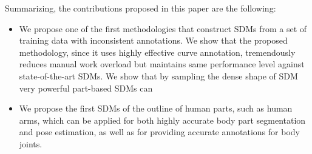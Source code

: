 Summarizing, the contributions proposed in this paper are the following:
\begin{itemize}

  \item We propose one of the first methodologies that construct SDMs from a set of training data with inconsistent annotations. We show that the proposed methodology, since it uses highly effective curve annotation, tremendously reduces manual work overload but maintains same performance level against state-of-the-art SDMs. We show that by sampling the dense shape of SDM very powerful part-based SDMs can

  \item We propose the first SDMs of the outline of human parts, such as human arms, which can be applied for both highly accurate body part segmentation and pose estimation, as well as for providing accurate annotations for body joints.

\end{itemize}












